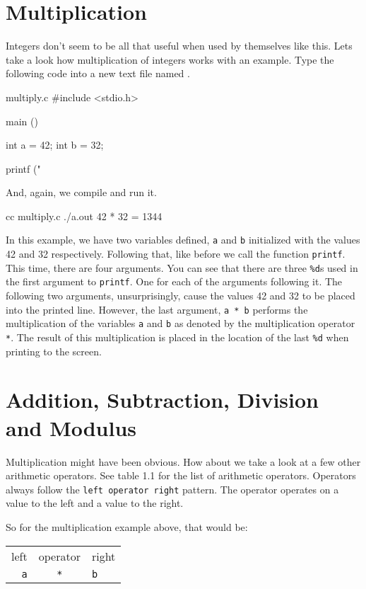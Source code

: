 \section{Multiplication}

Integers don't seem to be all that useful when used by themselves like this.
Lets take a look how multiplication of integers works with an example. Type
the following code into a new text file named .

\begin{code}{multiply.c}
#include <stdio.h>

main ()
{
    int a = 42;
    int b = 32;

    printf ("%
}
\end{code}

And, again, we compile and run it.

\begin{Terminal}
cc multiply.c
./a.out
42 * 32 = 1344
\end{Terminal}

In this example, we have two variables defined, \verb|a| and \verb|b|
initialized with the values 42 and 32 respectively. Following that, like before
we call the function \verb|printf|. This time, there are four arguments. You can
see that there are three \verb|%d|s used in the first argument to \verb|printf|.
One for each of the arguments following it. The following two arguments,
unsurprisingly, cause the values 42 and 32 to be placed into the printed line.
However, the last argument, \verb|a * b| performs the multiplication of the
variables \verb|a| and \verb|b| as denoted by the multiplication operator
\verb|*|. The result of this multiplication is placed in the location of the
last \verb|%d| when printing to the screen.

\section{Addition, Subtraction, Division and Modulus}

Multiplication might have been obvious. How about we take a look at a few other
arithmetic operators. See table 1.1 for the list of arithmetic operators.
Operators always follow the \verb|left operator right| pattern. The operator
operates on a value to the left and a value to the right.

So for the multiplication example above, that would be:

\begin{center}
\begin{tabular}{r c l}
left & operator & right \\
\verb|a| & \verb|*| & \verb|b| \\
\end{tabular}
\end{center}


